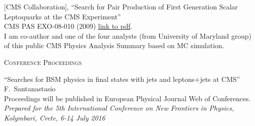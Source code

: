 \documentclass[10pt, a4paper]{article}
\begin{document}
\begin{thebibliography}{599}
[CMS Collaboration],
``Search for Pair Production of First Generation Scalar Leptoquarks at the CMS Experiment''\\
  CMS PAS EXO-08-010 (2009)
  \href{http://cdsweb.cern.ch/record/1196076/files/EXO-08-010-pas.pdf}{link
  to pdf}.
  \\I am co-author and one of the four analysts (from University of Maryland group) of this public CMS Physics Analysis Summary based on MC simulation.
  


\vspace{0.1cm} \begin{center} \textsc{Conference Proceedings} \end{center} \vspace{0.05cm}

  ``Searches for BSM physics in ﬁnal states with jets and leptons+jets
  at CMS''\\
 F.~Santanastasio\\
  Proceedings will be published in European Physical Journal Web of Conferences.\\
  {\it Prepared for the 5th International Conference on New Frontiers in Physics, Kolymbari, Crete, 6-14 July 2016} 


\end{thebibliography}
\end{document}
